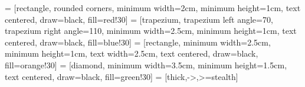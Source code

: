 \usetikzlibrary{shapes.geometric, arrows}

 = [rectangle, rounded corners, minimum width=2cm, minimum height=1cm, text centered, draw=black, fill=red!30]
 = [trapezium, trapezium left angle=70, trapezium right angle=110, minimum width=2.5cm, minimum height=1cm, text centered, draw=black, fill=blue!30]
 = [rectangle, minimum width=2.5cm, minimum height=1cm, text width=2.5cm, text centered, draw=black, fill=orange!30]
 = [diamond, minimum width=3.5cm, minimum height=1.5cm, text centered, draw=black, fill=green!30]
 = [thick,->,>=stealth]

